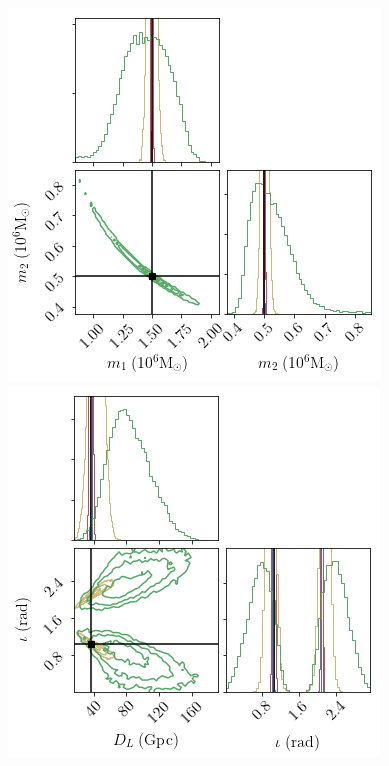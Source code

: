 \documentclass[aps,showpacs,twocolumn,prd,superscriptaddress,nofootinbib]{revtex4-1}
\begin{document}
\begin{figure}
  \centering
  \begin{minipage}{.32\linewidth}
      \includegraphics[width=.99\linewidth]{../plots/corner_smbh_case9_hm_tseries_m1m2.png}
   \end{minipage}
   \begin{minipage}{.32\linewidth}
      \includegraphics[width=.99\linewidth]{../plots/corner_smbh_case9_hm_tseries_Dinc.png}

\end{minipage}
\end{figure}
\end{document}
